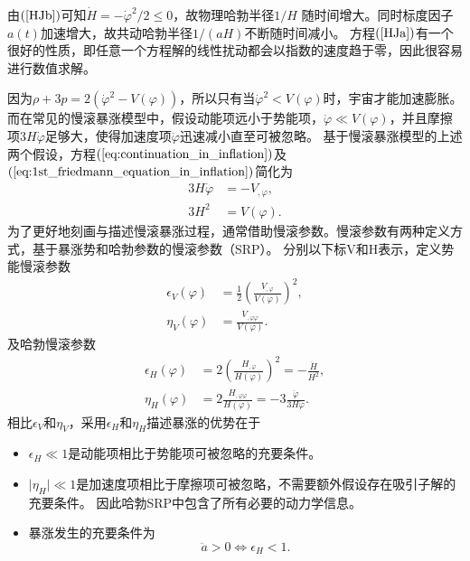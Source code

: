 由$(\ref{HJb})$可知$\dot H=-\dot \varphi^2 /2\leq 0$，故物理哈勃半径$1/H$
随时间增大。同时标度因子$a(t)$加速增大，故共动哈勃半径$1/(aH)$不断随时间减小。
方程$(\ref{HJa})$有一个很好的性质，即任意一个方程解的线性扰动都会以指数的速度趋于零，因此很容易进行数值求解。

因为$\rho+3p=2{(\dot{\varphi}^2-V(\varphi))}$，所以只有当$\dot{\varphi}^2<V(\varphi)$时，宇宙才能加速膨胀。
而在常见的慢滚暴涨模型中，假设动能项远小于势能项，$\dot{\varphi}\ll
V(\varphi)$，并且摩擦项$3H\dot{\varphi}$足够大，使得加速度项$\ddot{\varphi}$迅速减小直至可被忽略。
基于慢滚暴涨模型的上述两个假设，方程$(\ref{eq:continuation_in_inflation})$及$(\ref{eq:1st_friedmann_equation_in_inflation})$简化为
\begin{align}
  \label{eq:friedmann_equation_in_slow_roll_inflation}
  3H\dot{\varphi} &= -V_{,\varphi} , \\
  3H^2&=V(\varphi).
\end{align}
为了更好地刻画与描述慢滚暴涨过程，通常借助慢滚参数。慢滚参数有两种定义方式，基于暴涨势和哈勃参数的慢滚参数（SRP）。
分别以下标V和H表示，定义势能慢滚参数
\begin{align}
  \label{eq:PSRA_epsilon}
  \epsilon_V(\varphi) &= \frac{1}{2}
  {\left(\frac{V_{,\varphi}}{V(\varphi)}\right)}^2,
  \\
  \label{eq:PSRA_eta}
  \eta_V(\varphi) &= \frac{V_{,\varphi \varphi}}{V(\varphi)}.
\end{align}
及哈勃慢滚参数
\begin{align}
  \label{eq:HSRA_epsilon}
  \epsilon_H(\varphi) &= 2
  {\left(\frac{H_{,\varphi}}{H(\varphi)}\right)}^2=-\frac{\dot{H}}{H^2}, \\
  \label{eq:HSRA_eta}
  \eta_H(\varphi) &= 2 \frac{H_{,\varphi \varphi}}{H(\varphi)}=-3
  \frac{\ddot{\varphi}}{3H\dot{\varphi}}.
\end{align}
相比$\epsilon_V$和$\eta_V$，采用$\epsilon_H$和$\eta_H$描述暴涨的优势在于
\begin{itemize}
  \item $\epsilon_H\ll 1$是动能项相比于势能项可被忽略的充要条件。\\
  \item $\lvert \eta_H\rvert \ll
    1$是加速度项相比于摩擦项可被忽略，不需要额外假设存在吸引子解的充要条件。
    因此哈勃SRP中包含了所有必要的动力学信息。 \\
  \item 暴涨发生的充要条件为
    \begin{equation}
      \ddot{a} > 0 \Longleftrightarrow \epsilon_H < 1. 
    \end{equation}
\end{itemize}



